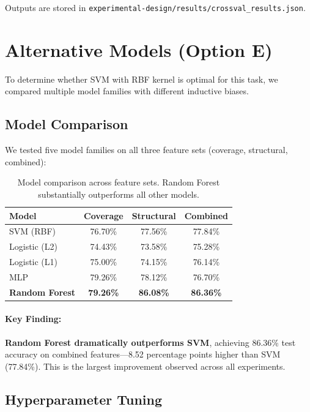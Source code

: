 \documentclass[12pt,a4paper]{article}
\begin{document}
Outputs are stored in \texttt{experimental-design/results/crossval\_results.json}.

\section{Alternative Models (Option E)}

To determine whether SVM with RBF kernel is optimal for this task, we compared multiple
model families with different inductive biases.

\subsection{Model Comparison}

We tested five model families on all three feature sets (coverage, structural, combined):

\begin{table}[h]
\centering
\small
\begin{tabular}{lccc}
\hline
\textbf{Model} & \textbf{Coverage} & \textbf{Structural} & \textbf{Combined} \\
\hline
SVM (RBF) & 76.70\% & 77.56\% & 77.84\% \\
Logistic (L2) & 74.43\% & 73.58\% & 75.28\% \\
Logistic (L1) & 75.00\% & 74.15\% & 76.14\% \\
MLP & 79.26\% & 78.12\% & 76.70\% \\
\textbf{Random Forest} & \textbf{79.26\%} & \textbf{86.08\%} & \textbf{86.36\%} \\
\hline
\end{tabular}
\caption{Model comparison across feature sets. Random Forest substantially outperforms all other models.}
\label{tab:model_comparison}
\end{table}

\paragraph{Key Finding:} \textbf{Random Forest dramatically outperforms SVM}, achieving 86.36\%
test accuracy on combined features---8.52 percentage points higher than SVM (77.84\%).
This is the largest improvement observed across all experiments.

\subsection{Hyperparameter Tuning}
\end{document}
